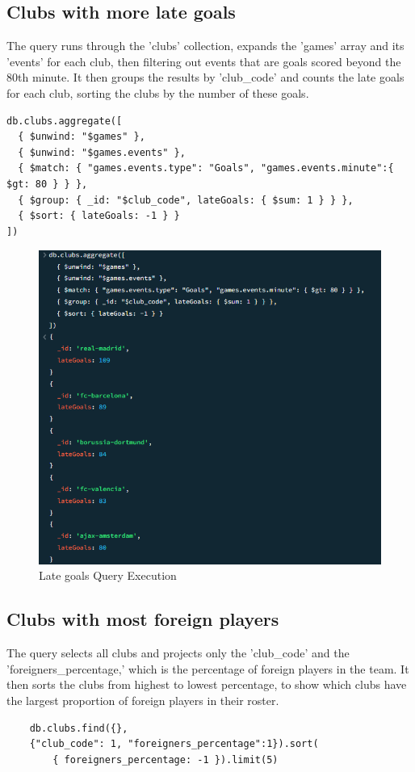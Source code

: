 \documentclass{Configuration_Files/PoliMi3i_thesis}
\begin{document}
\subsection{Clubs with more late goals}
The query runs through the 'clubs' collection, expands the 'games' array and its 'events' for each club, then filtering out events that are goals scored beyond the 80th minute. It then groups the results by 'club\_code' and counts the late goals for each club, sorting the clubs by the number of these goals.
\begin{verbatim}
db.clubs.aggregate([
  { $unwind: "$games" },
  { $unwind: "$games.events" },
  { $match: { "games.events.type": "Goals", "games.events.minute":{ $gt: 80 } } },
  { $group: { _id: "$club_code", lateGoals: { $sum: 1 } } },
  { $sort: { lateGoals: -1 } }
])
\end{verbatim}
\begin{figure}[htbp]
    \centering
    \includegraphics[scale=0.9]{Images/Queries/Clubs/late_goals_per_club/lgpc.png}
    \caption{Late goals Query Execution}
\end{figure}
\subsection{Clubs with most foreign players}
The query selects all clubs and projects only the 'club\_code' and the 'foreigners\_percentage,' which is the percentage of foreign players in the team. It then sorts the clubs from highest to lowest percentage, to show which clubs have the largest proportion of foreign players in their roster.
\begin{verbatim}
    db.clubs.find({}, 
    {"club_code": 1, "foreigners_percentage":1}).sort(
        { foreigners_percentage: -1 }).limit(5)
\end{verbatim}
\end{document}
